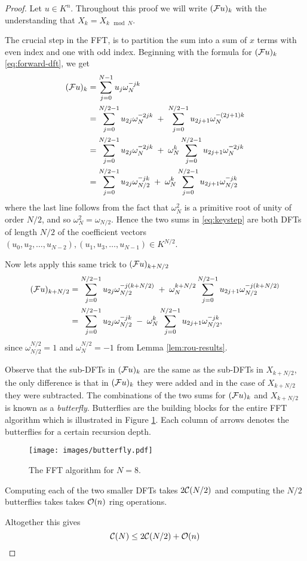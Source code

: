 \begin{proof}
    Let $u \in K^n$. Throughout this proof we will write $(\mathcal Fu)_k$ with the understanding that $X_{k} = X_{k \mod N}$.

    The crucial step in the FFT, is to partition the sum into a sum of $x$ terms with even index and one with odd index. Beginning with the formula for $(\mathcal Fu)_k$ \eqref{eq:forward-dft}, we get
    \begin{align}
        (\M{F}u)_k
        &= \sum^{N-1}_{j=0}u_j\omega_N^{\minus jk} \nonumber\\
        &= \sum^{N/2-1}_{j=0}u_{2j}\omega_N^{\minus 2jk} \;+\; \sum^{N/2-1}_{j=0}u_{2j+1} \omega_N^{\minus (2j+1)k} \nonumber\\
        &= \sum^{N/2-1}_{j=0}u_{2j}\omega_N^{\minus 2jk} \;+\; \omega_N^k \sum^{N/2-1}_{j=0}u_{2j+1}\omega_N^{\minus 2jk}\\
        &= \sum^{N/2-1}_{j=0}u_{2j}\omega_{N/2}^{\minus jk} \;+\; \omega_N^k \sum^{N/2-1}_{j=0}u_{2j+1}\omega_{N/2}^{\minus jk} \label{eq:keystep}
    \end{align}
    where the last line follows from the fact that $\omega_N^2$ is a primitive root of unity of order $N/2$, and so $\omega_N^2 = \omega_{N/2}$. Hence the two sums in \eqref{eq:keystep} are both DFTs of length $N/2$ of the coefficient vectors $(u_0, u_2, \ldots, u_{N-2}), (u_1, u_3, \ldots, u_{N-1}) \in K^{N/2}$. 

    Now lets apply this same trick to $(\mathcal Fu)_{k + N/2}$
    \begin{align*}
        (\M{F}u)_{k + N/2}
    &= \sum^{N/2-1}_{j=0}u_{2j}\omega_{N/2}^{\minus j(k + N/2)} \;+\; \omega_N^{k+ N/2} \sum^{N/2-1}_{j=0}u_{2j+1}\omega_{N/2}^{\minus j(k + N/2)}\\
    &= \sum^{N/2-1}_{j=0}u_{2j}\omega_{N/2}^{\minus jk} \;-\; \omega_N^k \sum^{N/2-1}_{j=0}u_{2j+1}\omega_{N/2}^{\minus jk},
    \end{align*}
    since $\omega_{N/2}^{N/2} = 1$ and $\omega_N^{N/2} = -1$ from Lemma \ref{lem:rou-results}.

    Observe that the sub-DFTs in $(\mathcal Fu)_k$ are the same as the sub-DFTs in $X_{k + N/2}$, the only difference is that in $(\mathcal Fu)_k$ they were added and in the case of $X_{k + N/2}$ they were subtracted. The combinations of the two sums for $(\mathcal Fu)_k$ and $X_{k + N/2}$ is known as a \textit{butterfly}. Butterflies are the building blocks for the entire FFT algorithm which is illustrated in Figure \ref{fig:butterflies}. Each column of arrows denotes the butterflies for a certain recursion depth.
    
    \begin{figure}[t]
        \centering
        \texttt{[image: images/butterfly.pdf]}
        \caption{The FFT algorithm for $N = 8$.}
        \label{fig:butterflies}
    \end{figure}

    Computing each of the two smaller DFTs takes $2\mathcal C(N/2)$ and computing the $N/2$ butterflies takes takes $\mathcal O(n)$ ring operations.

    Altogether this gives
    \[
        \mathcal C(N) \le 2 \mathcal C(N/2) + \mathcal O(n)
    \]
\end{proof}
